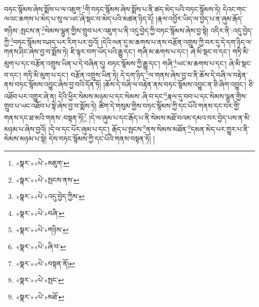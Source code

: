 བཏང་སྙོམས་ཞེས་སྨོས་པ་ལ་འཇུག་\footnote{«སྣར་»«པེ་»མཇུག་}གི་བཏང་སྙོམས་ཞེས་སྨོས་པ་ནི་ཚད་མེད་པའི་བཏང་སྙོམས་ཏེ། དེའང་གང་ལའང་ཆགས་པ་མེད་པ་སུ་ལ་ཡང་ཞེ་སྡང་བ་མེད་པའི་མཚན་ཉིད་དོ། །རྣལ་འབྱོར་ཡིད་ལ་བྱེད་པ་ན་ཞུམ་རྒོད་གཉིས་:སྤངས་ན་\footnote{«སྣར་»«པེ་»སྤངས་ནས་}སེམས་ལྷུན་གྱིས་གྲུབ་པར་འཇུག་པ་ནི་འདུ་བྱེད་ཀྱི་བཏང་སྙོམས་ཞེས་བྱ་སྟེ། འདིར་ནི་:འདུ་བྱེད་ཀྱི་\footnote{«སྣར་»«པེ་»འདུ་བྱེད་ཀྱིས་}བཏང་སྙོམས་བཤད་པར་རིག་པར་བྱའོ། །དེའི་ལན་དུ་མ་ཆགས་པ་ནས་བརྩོན་འགྲུས་ཀྱི་བར་དུ་དེ་དག་ཉིད་ལ་གནས་ཤིང་ཞེས་བྱ་བ་སྨོས་ཏེ། ཇི་ལྟར་བག་ཡོད་པའི་རྒྱུ་དང་། གཞི་མ་ཆགས་པ་དང་། ཞེ་མི་སྡང་བ་དང་། གཏི་མི་མུག་པ་དང་བརྩོན་འགྲུས་ཡིན་པ་དེ་བཞིན་དུ། བཏང་སྙོམས་ཀྱི་རྒྱུ་དང་། གཞི་\footnote{«སྣར་»«པེ་»བཞི་}ཡང་མ་ཆགས་པ་དང་། ཞེ་མི་སྡང་བ་དང་། གཏི་མི་མུག་པ་དང་། བརྩོན་འགྲུས་ཡིན་ཏེ། དེ་དག་ཉིད་\footnote{«སྣར་»«པེ་»གཉིས་}ལ་གནས་ཞེས་བྱ་བ་ནི་ཆོས་དེ་བཞི་ལ་བརྟེན་ནས་བཏང་སྙོམས་འབྱུང་ཞེས་བྱ་བའི་དོན་ཏོ། །ཆོས་དེ་བཞི་ལ་བརྟེན་ནས་བཏང་སྙོམས་འབྱུང་ན་ཅི་ཞིག་འབྱུང་། ཅི་འཐོབ་པར་འགྱུར་ཞེ་ན། དེའི་ཕྱིར་སེམས་མཉམ་པ་དང་སེམས་:ཞི་བ་དང་\footnote{«སྣར་»«པེ་»ཞི་བ་}རྣལ་དུ་བབ་པ་དང་སེམས་ལྷུན་གྱིས་གྲུབ་པ་ཡང་འཐོབ་པ་སྟེ་ཞེས་བྱ་བ་སྨོས་ཏེ། ཚིག་དེ་གསུམ་གྱིས་བཏང་སྙོམས་ཀྱི་དང་པོའི་གནས་དང་བར་གྱི་གནས་དང་ཐ་མའི་གནས་:བསྟན་ཏོ།\footnote{«སྣར་»«པེ་»བསྟན་ནོ།} །དེ་ལ་ཞུམ་པ་དང་རྒོད་པ་ནི་སེམས་མཐོ་བའམ་དམའ་བར་བྱེད་པས་ན་མི་མཉམ་པ་ཞེས་བྱའོ། །དེ་ལ་དང་པོར་ཞུམ་པ་དང་། རྒོད་པ་སྤངས་\footnote{«སྣར་»«པེ་»སྤང་}ནས་སེམས་མཐོན་\footnote{«སྣར་»«པེ་»མཐོ་}དམན་མེད་པར་གྱུར་པ་ནི་སེམས་མཉམ་པ་སྟེ། དེས་བཏང་སྙོམས་ཀྱི་དང་པོའི་གནས་བསྟན་ཏོ། །
